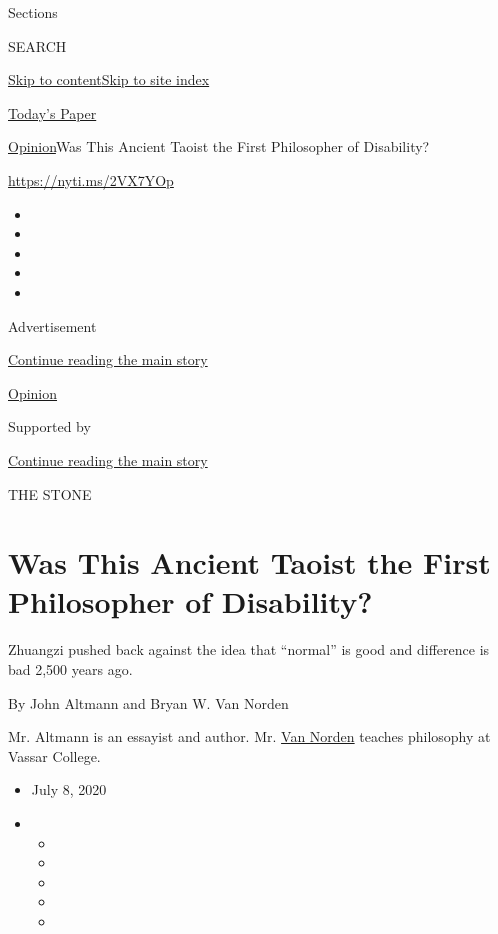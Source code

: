 Sections

SEARCH

\protect\hyperlink{site-content}{Skip to
content}\protect\hyperlink{site-index}{Skip to site index}

\href{https://myaccount.nytimes3xbfgragh.onion/auth/login?response_type=cookie\&client_id=vi}{}

\href{https://www.nytimes3xbfgragh.onion/section/todayspaper}{Today's
Paper}

\href{/section/opinion}{Opinion}\textbar{}Was This Ancient Taoist the
First Philosopher of Disability?

\url{https://nyti.ms/2VX7YOp}

\begin{itemize}
\item
\item
\item
\item
\item
\end{itemize}

Advertisement

\protect\hyperlink{after-top}{Continue reading the main story}

\href{/section/opinion}{Opinion}

Supported by

\protect\hyperlink{after-sponsor}{Continue reading the main story}

THE STONE

\hypertarget{was-this-ancient-taoist-the-first-philosopher-of-disability}{%
\section{Was This Ancient Taoist the First Philosopher of
Disability?}\label{was-this-ancient-taoist-the-first-philosopher-of-disability}}

Zhuangzi pushed back against the idea that ``normal'' is good and
difference is bad 2,500 years ago.

By John Altmann and Bryan W. Van Norden

Mr. Altmann is an essayist and author. Mr.
\href{http://www.bryanvannorden.com/}{Van Norden} teaches philosophy at
Vassar College.

\begin{itemize}
\item
  July 8, 2020
\item
  \begin{itemize}
  \item
  \item
  \item
  \item
  \item
  \end{itemize}
\end{itemize}


